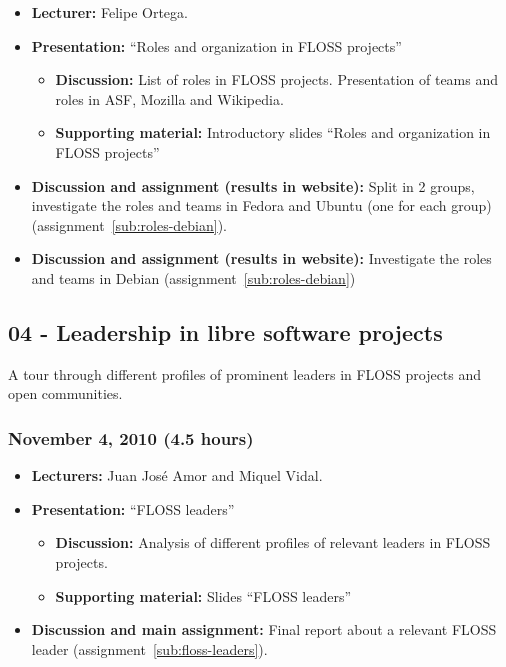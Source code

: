 \documentclass[a4paper]{article}
\begin{document}
\begin{itemize}
\item \textbf{Lecturer:} Felipe Ortega.
\item \textbf{Presentation:} ``Roles and organization in FLOSS projects''
  \begin{itemize}
  \item \textbf{Discussion:} List of roles in FLOSS projects. Presentation of teams and roles in ASF, Mozilla and Wikipedia.
  \item \textbf{Supporting material:} Introductory slides ``Roles and organization in FLOSS projects''
  \end{itemize}
\item \textbf{Discussion and assignment (results in website):} Split in 2 groups, investigate the roles and teams in Fedora and Ubuntu (one for each group) (assignment~\ref{sub:roles-debian}).
\item \textbf{Discussion and assignment (results in website):} Investigate the roles and teams in Debian (assignment~\ref{sub:roles-debian})
\end{itemize}

\subsection{04 - Leadership in libre software projects}

A tour through different profiles of prominent leaders in FLOSS projects and open communities.

\subsubsection{November 4, 2010 (4.5 hours)}

\begin{itemize}
\item \textbf{Lecturers:} Juan José Amor and Miquel Vidal.
\item \textbf{Presentation:} ``FLOSS leaders''
  \begin{itemize}
  \item \textbf{Discussion:} Analysis of different profiles of relevant leaders in FLOSS projects.
  \item \textbf{Supporting material:} Slides ``FLOSS leaders''
  \end{itemize}
\item \textbf{Discussion and main assignment:} Final report about a relevant FLOSS leader (assignment~\ref{sub:floss-leaders}).

\end{itemize}
\end{document}
